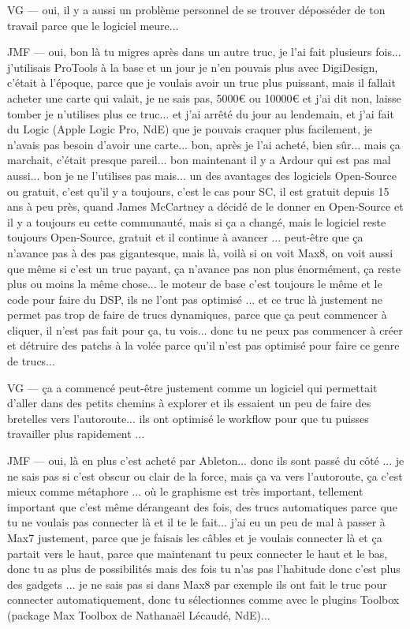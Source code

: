VG — oui, il y a aussi un problème personnel de se trouver déposséder de ton travail parce que le logiciel meure... 

JMF — oui, bon là tu migres après dans un autre truc, je l'ai fait plusieurs fois... j'utilisais ProTools à la base et un jour je n'en pouvais plus avec DigiDesign, c'était à l'époque, parce que je voulais avoir un truc plus puissant, mais il fallait acheter une carte qui valait, je ne sais pas, 5000€ ou 10000€ et j'ai dit non, laisse tomber je n'utilises plus ce truc... et j'ai arrêté du jour au lendemain, et j'ai fait du Logic (Apple Logic Pro, NdE) que je pouvais craquer plus facilement, je n'avais pas besoin d'avoir une carte... bon, après je l'ai acheté, bien sûr... mais ça marchait, c'était presque pareil... bon maintenant il y a Ardour qui est pas mal aussi... bon je ne l'utilises pas mais... un des avantages des logiciels Open-Source ou gratuit, c'est qu'il y a toujours, c'est le cas pour SC, il est gratuit depuis 15 ans à peu près, quand James McCartney a décidé de le donner en Open-Source et il y a toujours eu cette communauté, mais si ça a changé, mais le logiciel reste toujours Open-Source, gratuit et il continue à avancer ... peut-être que ça n'avance pas à des pas gigantesque, mais là, voilà si on voit Max8, on voit aussi que même si c'est un truc payant, ça n'avance pas non plus énormément, ça reste plus ou moins la même chose... le moteur de base c'est toujours le même et le code pour faire du DSP, ils ne l'ont pas optimisé ... et ce truc là justement ne permet pas trop de faire de trucs dynamiques, parce que ça peut commencer à cliquer, il n'est pas fait pour ça, tu vois... donc tu ne peux pas commencer à créer et détruire des patchs à la volée parce qu'il n'est pas optimisé pour faire ce genre de trucs... 

VG — ça a commencé peut-être justement comme un logiciel qui permettait d'aller dans des petits chemins à explorer et ils essaient un peu de faire des bretelles vers l'autoroute... ils ont optimisé le workflow pour que tu puisses travailler plus rapidement ... 

JMF — oui, là en plus c'est acheté par Ableton... donc ils sont passé du côté ... je ne sais pas si c'est obscur ou clair de la force, mais ça va vers l'autoroute, ça c'est mieux comme métaphore ... où le graphisme est très important, tellement important que c'est même dérangeant des fois, des trucs automatiques parce que tu ne voulais pas connecter là et il te le fait... j'ai eu un peu de mal à passer à Max7 justement, parce que je faisais les câbles et je voulais connecter là et ça partait vers le haut, parce que maintenant tu peux connecter le haut et le bas, donc tu as plus de possibilités mais des fois tu n'as pas l'habitude donc c'est plus des gadgets ... je ne sais pas si dans Max8 par exemple ils ont fait le truc pour connecter automatiquement, donc tu sélectionnes comme avec le plugins Toolbox (package Max Toolbox de Nathanaël Lécaudé, NdE)... 

